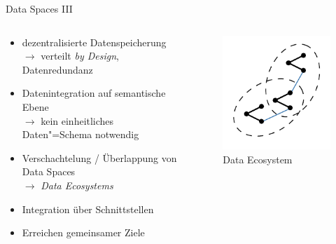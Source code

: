 \begin{frame}{Data Spaces III \footnotesize\cite{mollerIndustrialDataEcosystems2024}}
    \begin{columns}
        \begin{column}{0.6\textwidth}
            \begin{itemize}
                \item dezentralisierte Datenspeicherung\\
                      $\to$ verteilt \emph{by Design}, Datenredundanz
                
                \item Datenintegration auf semantische Ebene\\
                      $\to$ kein einheitliches Daten"=Schema notwendig
                
                \item Verschachtelung / Überlappung von Data Spaces\\
                      $\to$ \emph{Data Ecosystems}
                
                \item Integration über Schnittstellen
                \item Erreichen gemeinsamer Ziele
            \end{itemize}
        \end{column}

        \begin{column}{0.4\textwidth}
            \begin{figure}
                \includegraphics[height=0.5\textheight]{./assets/data_ecosystem_architecture.drawio.pdf}
                \caption{Data Ecosystem}
            \end{figure}
        \end{column}
    \end{columns}
\end{frame}


